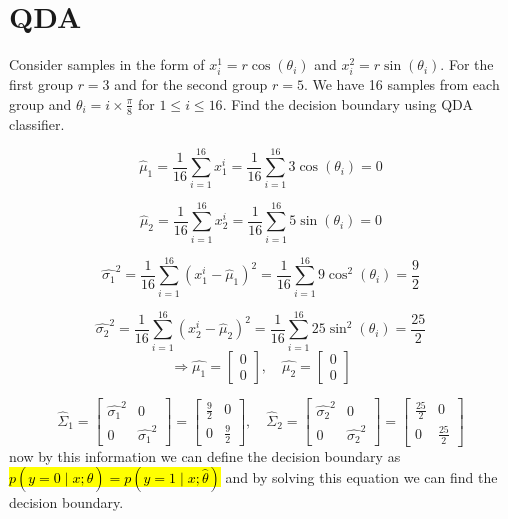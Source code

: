 \section{QDA}

Consider samples in the form of $x_i^1 = r \cos(\theta_i)$ and $x_i^2 = r \sin(\theta_i)$. For the first group $r = 3$ and for the second group $r = 5$. We have 16 samples from each group and $\theta_i = i \times \frac{\pi}{8}$ for $1 \leq i \leq 16$. Find the decision boundary using QDA classifier.
\begin{qsolve}
	\begin{qsolve}[]
		$$
			\hat{\mu}_1 = \frac{1}{16} \sum_{i=1}^{16} x_1^i = \frac{1}{16} \sum_{i=1}^{16} 3 \cos(\theta_i) = 0
		$$

		$$
			\hat{\mu}_2 = \frac{1}{16} \sum_{i=1}^{16} x_2^i = \frac{1}{16} \sum_{i=1}^{16} 5 \sin(\theta_i) = 0
		$$

		$$
			\hat{\sigma_1}^2 = \frac{1}{16} \sum_{i=1}^{16} (x_1^i - \hat{\mu}_1)^2 = \frac{1}{16} \sum_{i=1}^{16} 9 \cos^2(\theta_i) = \frac{9}{2}
		$$

		$$
			\hat{\sigma_2}^2 = \frac{1}{16} \sum_{i=1}^{16} (x_2^i - \hat{\mu}_2)^2 = \frac{1}{16} \sum_{i=1}^{16} 25 \sin^2(\theta_i) = \frac{25}{2}
		$$
		$$
		\Rightarrow \hat{\mu_1} = \begin{bmatrix}
			0 \\ 0
		\end{bmatrix} , \quad \hat{\mu_2} = \begin{bmatrix}
			0 \\ 0
			\end{bmatrix} 
		$$

		$$
		\hat{\Sigma}_1 = \begin{bmatrix}
			\hat{\sigma_1}^2 & 0 \\
			0 & \hat{\sigma_1}^2
		\end{bmatrix} = \begin{bmatrix}
			\frac{9}{2} & 0 \\
			0 & \frac{9}{2}
		\end{bmatrix} , \quad \hat{\Sigma}_2 = \begin{bmatrix}
			\hat{\sigma_2}^2 & 0 \\
			0 & \hat{\sigma_2}^2
		\end{bmatrix} = \begin{bmatrix}
			\frac{25}{2} & 0 \\
			0 & \frac{25}{2}
		\end{bmatrix}
		$$
		now by this information we can define the decision boundary as \hl{$p(y=0\mid x;\hat{\theta}) = p(y=1\mid x;\hat{\theta})$} and by solving this equation we can find the decision boundary.
	

\end{qsolve}
\end{qsolve}
